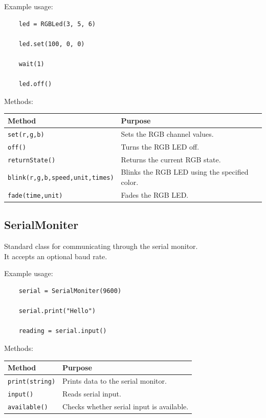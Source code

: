 Example usage:

\begin{lstlisting}
	led = RGBLed(3, 5, 6)
	
	led.set(100, 0, 0)
	
	wait(1)
	
	led.off()
\end{lstlisting}

Methods:

\begin{tabular}{ll}
	\toprule
	\textbf{Method} & \textbf{Purpose}\\
	\midrule
	\texttt{set(r,g,b)} & Sets the RGB channel values.\\
	\texttt{off()} & Turns the RGB LED off.\\
	\texttt{returnState()} & Returns the current RGB state.\\
	\texttt{blink(r,g,b,speed,unit,times)} & Blinks the RGB LED using the specified color.\\
	\texttt{fade(time,unit)} & Fades the RGB LED.\\
	\bottomrule
\end{tabular}


\subsection{SerialMoniter}

Standard class for communicating through the serial monitor.\\
It accepts an optional baud rate.

Example usage:

\begin{lstlisting}
	serial = SerialMoniter(9600)
	
	serial.print("Hello")
	
	reading = serial.input()
\end{lstlisting}

Methods:

\begin{tabular}{ll}
	\toprule
	\textbf{Method} & \textbf{Purpose}\\
	\midrule
	\texttt{print(string)} & Prints data to the serial monitor.\\
	\texttt{input()} & Reads serial input.\\
	\texttt{available()} & Checks whether serial input is available.\\
	\bottomrule
\end{tabular}

